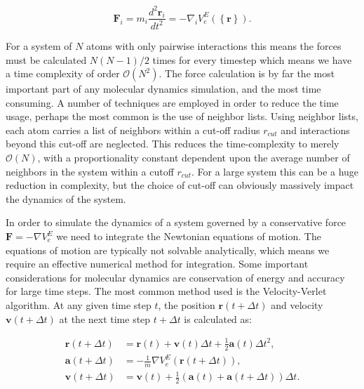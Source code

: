 \begin{equation}
 \bm{F}_i = m_i \frac{d^2 \bm{r}_i}{dt^2} =
    -\nabla_i V_e^E \left( \left\{ \bm{r} \right\}\right) . 
\end{equation}

For a system of $N$ atoms with only pairwise interactions
this means the forces must be calculated $N(N-1)/2$ times
for every timestep which means we have a time complexity
of order $\mathcal{O}(N^2)$. The force calculation is by far
the most important part of any molecular dynamics simulation,
and the most time consuming.
A number of techniques are employed in order to reduce
the time usage, perhaps the most common is the use of neighbor
lists. Using neighbor lists, each atom carries a list of neighbors
within a cut-off radius $r_{cut}$ and interactions
beyond this cut-off are neglected.
This reduces the time-complexity to merely
$\mathcal{O}(N)$, with a proportionality constant
dependent upon the average number of neighbors in the system
within a cutoff $r_{cut}$. For a large system this can be a
huge reduction in complexity, but the choice of cut-off
can obviously massively impact the dynamics of the system.
\par
In order to simulate the dynamics of a system governed by
a conservative force $\bm{F} = - \nabla V_e^E$
we need to integrate the Newtonian equations of motion.
The equations of motion are typically not solvable
analytically, which means we require an effective numerical
method for integration. Some important considerations
for molecular dynamics are conservation of energy
and accuracy for large time steps.
The most common method used is the Velocity-Verlet algorithm.
At any given time step $t$, the position $\bm{r}(t + \Delta t)$
and velocity $\bm{v}(t + \Delta t)$ at the next time step
$t + \Delta t$ is calculated as:

\begin{equation}
    \begin{split}
        \bm{r}(t + \Delta t)
        &= \bm{r}(t) + \bm{v}(t) \Delta t
        + \frac{1}{2} \bm{a}(t)\Delta t^2 , \\
        \bm{a}(t + \Delta t)
        &= -\frac{1}{m} \nabla V_e^E(\bm{r}(t + \Delta t)) , \\
        \bm{v}(t + \Delta t)
        &= \bm{v}(t) + \frac{1}{2}
        (\bm{a}(t) + \bm{a}(t + \Delta t)) \Delta t .
    \end{split}
\end{equation}

